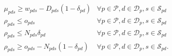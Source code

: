 \documentclass[12pt]{article}
\theoremstyle{thmstylethree}%
\begin{document}
\begin{appendices}
\begin{subequations}
\begin{align}
\label{eq:fullmodel:c9}            &\mu_{pds}\geq w_{pds} - D_{pds}(1-\delta_{pd})&\forall p\in\mathcal{P}, d\in\mathcal{D}_p, s\in\mathcal{S}_{pd}\\
\label{eq:fullmodel:c10}            &\rho_{pds}\leq o_{pds}&\forall p\in\mathcal{P}, d\in\mathcal{D}_p, s\in\mathcal{S}_{pd}\\   
\label{eq:fullmodel:c11}            &\rho_{pds}\leq N_{pds}\delta_{pd}&\forall p\in\mathcal{P}, d\in\mathcal{D}_p, s\in\mathcal{S}_{pd}\\
\label{eq:fullmodel:c12}            &\rho_{pds}\geq o_{pds} - N_{pds}(1-\delta_{pd})&\forall p\in\mathcal{P}, d\in\mathcal{D}_p, s\in\mathcal{S}_{pd}.
\end{align}
\end{subequations}



\end{appendices}
\end{document}
